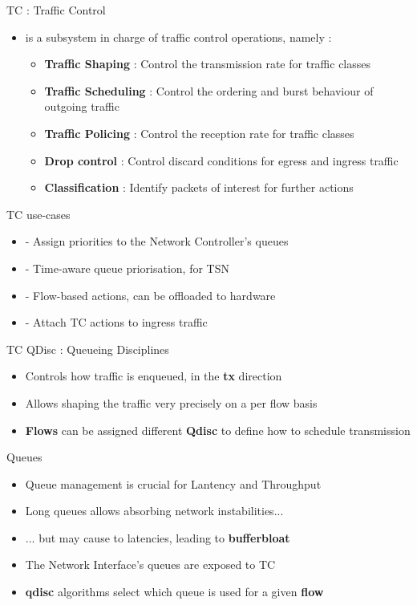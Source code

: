 \begin{frame}{TC : Traffic Control}
	\begin{itemize}
		\item {} is a subsystem in charge of traffic control operations, namely :
			\begin{itemize}
				\item \textbf{Traffic Shaping} : Control the transmission rate for traffic classes
				\item \textbf{Traffic Scheduling} : Control the ordering and burst behaviour of outgoing traffic
				\item \textbf{Traffic Policing} : Control the reception rate for traffic classes
				\item \textbf{Drop control} : Control discard conditions for egress and ingress traffic
				\item \textbf{Classification} : Identify packets of interest for further actions
			\end{itemize}
	\end{itemize}
\end{frame}

\begin{frame}{TC use-cases}
	\begin{itemize}
		\item {} - Assign priorities to the Network Controller's queues
		\item {} - Time-aware queue priorisation, for TSN
		\item {} - Flow-based actions, can be offloaded to hardware
		\item {} - Attach TC actions to ingress traffic
	\end{itemize}
\end{frame}

\begin{frame}{TC QDisc : Queueing Disciplines}
	\begin{itemize}
		\item Controls how traffic is enqueued, in the \textbf{tx} direction
		\item Allows shaping the traffic very precisely on a per flow basis
		\item \textbf{Flows} can be assigned different \textbf{Qdisc} to define how to schedule transmission
	\end{itemize}
\end{frame}

\begin{frame}{Queues}
	\begin{itemize}
		\item Queue management is crucial for Lantency and Throughput
		\item Long queues allows absorbing network instabilities...
		\item ... but may cause to latencies, leading to \textbf{bufferbloat}
		\item The Network Interface's queues are exposed to TC
		\item \textbf{qdisc} algorithms select which queue is used for a given \textbf{flow}
	\end{itemize}
\end{frame}

